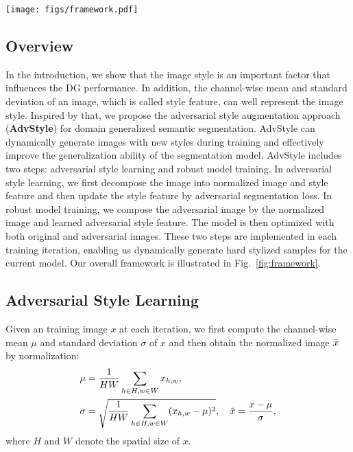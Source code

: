 \documentclass{article}
\newcommand{\ours}{AdvStyle\xspace}
\begin{document}
\begin{figure*}[!t]
\centering
\texttt{[image: figs/framework.pdf]}
\caption{The framework of the proposed adversarial style augmentation.}
\label{fig:framework}
\end{figure*}


\subsection{Overview}

In the introduction, we show that the image style is an important factor that influences the DG performance. In addition, the channel-wise mean and standard deviation of an image, which is called style feature, can well represent the image style. Inspired by that, we propose the adversarial style augmentation approach (\textbf{\ours}) for domain generalized semantic segmentation. \ours can dynamically generate images with new styles during training and effectively improve the generalization ability of the segmentation model. \ours includes two steps: adversarial style learning and robust model training. In adversarial style learning, we first decompose the image into normalized image and style feature and then update the style feature by adversarial segmentation loss. In robust model training, we compose the adversarial image by the normalized image and learned adversarial style feature. The model is then optimized with both original and adversarial images. These two steps are implemented in each training iteration, enabling us dynamically generate hard stylized samples for the current model. Our overall framework is illustrated in Fig.~\ref{fig:framework}.


\subsection{Adversarial Style Learning}

Given an training image $x$ at each iteration, we first compute the channel-wise mean $\mu$ and standard deviation $\sigma$ of $x$ and then obtain the normalized image $\Bar{x}$ by normalization:
\begin{equation}
\label{eq:decompose}
\begin{aligned}
&\mu = \frac{1}{HW}\sum_{h\in H,w \in W} x_{h,w},\\ 
&\sigma = \sqrt{\frac{1}{HW}\sum_{h\in H,w \in W} (x_{h,w}-\mu)^2}, \hspace{1em} \Bar{x} = \frac{x - \mu}{\sigma},
\end{aligned}
\end{equation}
where $H$ and $W$ denote the spatial size of $x$.
\end{document}
